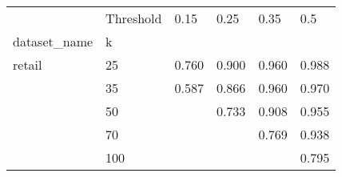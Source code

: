 \begin{tabular}{llllll}
\toprule
       & Threshold &   0.15 &   0.25 &   0.35 &    0.5 \\
dataset_name & k &        &        &        &        \\
\midrule
retail & 25  &  0.760 &  0.900 &  0.960 &  0.988 \\
       & 35  &  0.587 &  0.866 &  0.960 &  0.970 \\
       & 50  &        &  0.733 &  0.908 &  0.955 \\
       & 70  &        &        &  0.769 &  0.938 \\
       & 100 &        &        &        &  0.795 \\
\bottomrule
\end{tabular}

